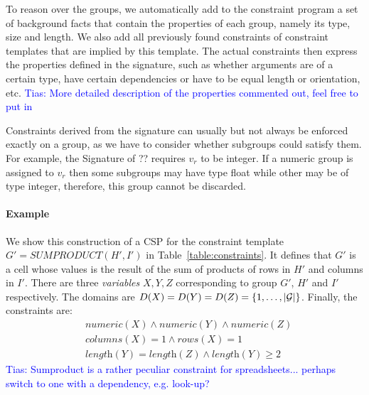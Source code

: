 \documentclass{sig-alternate-05-2015}
\newcommand{\tias}[1]{\textcolor{blue}{{\sc Tias:} #1}\xspace}
\newcommand{\format}[1]{\textit{#1}\xspace}
\newcommand{\CSignature}{Signature\xspace}
\newcommand{\eccalc}[2]{\ensuremath{#1 = #2}}
\newcommand{\ecsumprod}[3]{\eccalc{#1}{\mathit{SUMPRODUCT}(#2, #3)}}
\newcommand{\plength}{\format{length}}
\newcommand{\prows}{\format{rows}}
\newcommand{\pcols}{\format{columns}}
\begin{document}
To reason over the groups, we automatically add to the constraint program a set of background facts that contain the properties of each group, namely its type, size and length. We also add all previously found constraints of constraint templates that are implied by this template. The actual constraints then express the properties defined in the signature, such as whether arguments are of a certain type, have certain dependencies or have to be equal length or orientation, etc.
\tias{More detailed description of the properties commented out, feel free to put in}

Constraints derived from the signature can usually but not always be enforced exactly on a group, as we have to consider whether subgroups could satisfy them.
For example, the \CSignature of ?? requires $v_r$ to be integer.
If a numeric group is assigned to $v_r$ then some subgroups may have type float while other may be of type integer, therefore, this group cannot be discarded.


\paragraph{Example}
We show this construction of a CSP for the constraint template $\ecsumprod{G'}{H'}{I'}$ in Table~\ref{table:constraints}. It defines that $G'$ is a cell whose values is the result of the sum of products of rows in $H'$ and columns in $I'$.
%
There are three \textit{variables} $X, Y, Z$ corresponding to group $G'$, $H'$ and $I'$ respectively. The domains are $D(X) = D(Y) = D(Z) = \{1, \ldots, |{\cal G}|\}$. Finally, the constraints are:
\begin{align*}
&numeric(X) \land numeric(Y) \land numeric(Z) \\
&\pcols(X) = 1 \land \prows(X) = 1 \\
&\plength(Y) = \plength(Z) \land \plength(Y) \geq 2
\end{align*}
\tias{Sumproduct is a rather peculiar constraint for spreadsheets... perhaps switch to one with a dependency, e.g. look-up?}
\\\\
\end{document}
